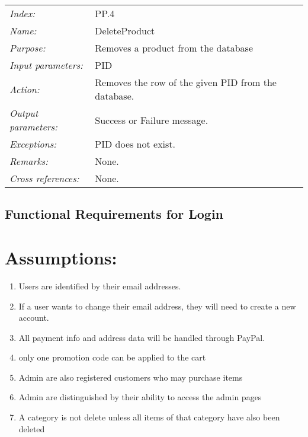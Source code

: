 \documentclass[10pt,letter]{article}
\begin{document}
\begin{tabularx}{\textwidth}{l X}
    \it{Index:} & PP.4 \\
    \it{Name:} & DeleteProduct \\
    \it{Purpose:} & Removes a product from the database\\
    \it{Input parameters:} & PID\\
    \it{Action:} & Removes the row of the given PID from the database.\\
    \it{Output parameters:} & Success or Failure message. \\
    \it{Exceptions:} & PID does not exist. \\
    \it{Remarks:} & None. \\
    \it{Cross references:} & None. \\
    \hline
\end{tabularx}


\subsection{Functional Requirements for Login}


\section{Assumptions:}
\begin{enumerate}
    \item Users are identified by their email addresses.
    \item If a user wants to change their email address, they will need to create a new account.
    \item All payment info and address data will be handled through PayPal.
    \item only one promotion code can be applied to the cart
    \item Admin are also registered customers who may purchase items
    \item Admin are distinguished by their ability to access the admin pages
    \item A category is not delete unless all items of that category have also been deleted
\end{enumerate}
\end{document}
